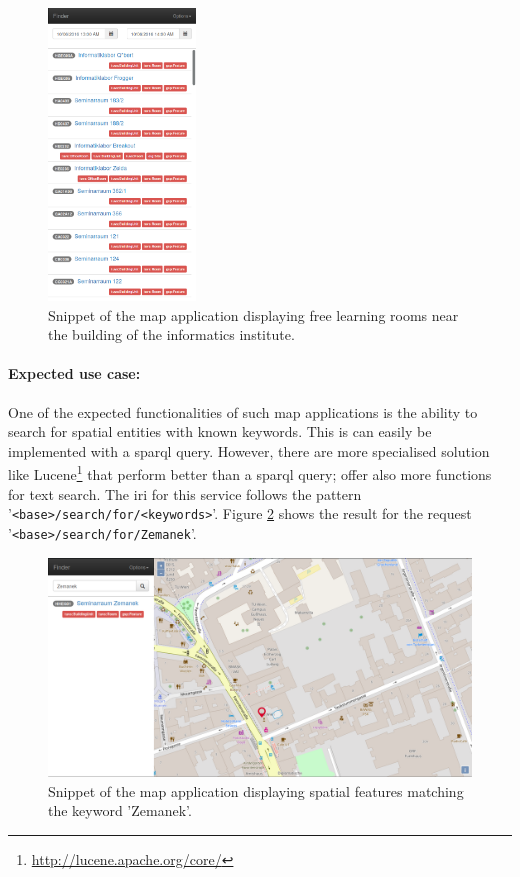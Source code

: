 \documentclass[draft,final]{vutinfth} %
\begin{document}
\begin{figure}
    \centering
    \includegraphics[width=0.35\textwidth]{graphics/solution/app/serachForFreeRooms.png}
    \caption{Snippet of the map application displaying free learning rooms near the building of the informatics institute.}
    \label{fig:solution-architectural-map-app:freerooms}
\end{figure}

\paragraph{Expected use case:} One of the expected functionalities of such map applications is the ability to search for spatial entities with known keywords. This is can easily be implemented with a \gls{sparql} query. However, there are more specialised solution like Lucene\footnote{\url{http://lucene.apache.org/core/}} that perform better than a \gls{sparql} query; offer also more functions for text search. The \gls{iri} for this service follows the pattern '\texttt{<base>/search/for/<keywords>}'. Figure \ref{fig:solution-architectural-map-app:rooms-match-keyword} shows the result for the request '\texttt{<base>/search/for/Zemanek}'.

\begin{figure}
    \centering
    \includegraphics[width=1.0\textwidth]{graphics/solution/app/searchFor.png}
    \caption{Snippet of the map application displaying spatial features matching the keyword 'Zemanek'.}
    \label{fig:solution-architectural-map-app:rooms-match-keyword}
\end{figure}
\end{document}
